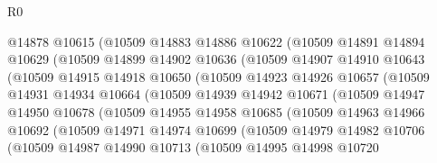 \begin{lexlean}{R0}
\begin{coremodule}
                    @14878
                    @10615
                    (@10509
                      @14883
                      @14886
                      @10622
                      (@10509
                        @14891
                        @14894
                        @10629
                        (@10509
                          @14899
                          @14902
                          @10636
                          (@10509
                            @14907
                            @14910
                            @10643
                            (@10509
                              @14915
                              @14918
                              @10650
                              (@10509
                                @14923
                                @14926
                                @10657
                                (@10509
                                  @14931
                                  @14934
                                  @10664
                                  (@10509
                                    @14939
                                    @14942
                                    @10671
                                    (@10509
                                      @14947
                                      @14950
                                      @10678
                                      (@10509
                                        @14955
                                        @14958
                                        @10685
                                        (@10509
                                          @14963
                                          @14966
                                          @10692
                                          (@10509
                                            @14971
                                            @14974
                                            @10699
                                            (@10509
                                              @14979
                                              @14982
                                              @10706
                                              (@10509
                                                @14987
                                                @14990
                                                @10713
                                                (@10509
                                                  @14995
                                                  @14998
                                                  @10720

\end{coremodule}
\end{lexlean}
